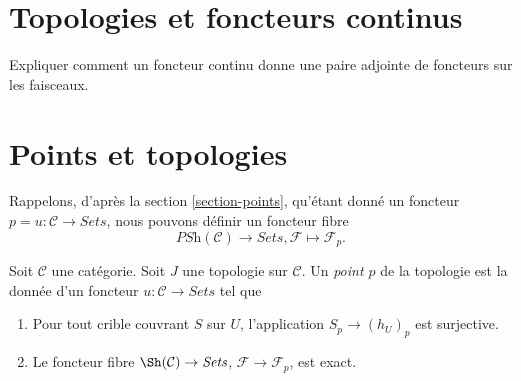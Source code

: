 \section{Topologies et foncteurs continus}
\label{section-topologies-continuous-functors}

\noindent
Expliquer comment un foncteur continu donne une paire adjointe
de foncteurs sur les faisceaux.





\section{Points et topologies}
\label{section-points-topologies}

\noindent
Rappelons, d'après la section \ref{section-points}, qu'étant donné un foncteur
$p = u : \mathcal{C} \to \textit{Sets}$, nous pouvons définir
un foncteur fibre
$$
\textit{PSh}(\mathcal{C}) \longrightarrow \textit{Sets},
\mathcal{F} \longmapsto \mathcal{F}_p.
$$

\begin{definition}
\label{definition-point-topology}
Soit $\mathcal{C}$ une catégorie.
Soit $J$ une topologie sur $\mathcal{C}$.
Un {\it point $p$} de la topologie est la donnée d'un foncteur
$u : \mathcal{C} \to \textit{Sets}$ tel que
\begin{enumerate}
\item Pour tout crible couvrant $S$ sur $U$, l'application
$S_p \to (h_U)_p$ est surjective.
\item Le foncteur fibre $\Sh(\mathcal{C}) \to \textit{Sets}$,
$\mathcal{F} \to \mathcal{F}_p$, est exact.
\end{enumerate}
\end{definition}


















